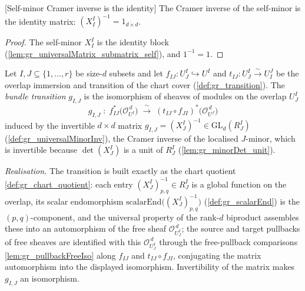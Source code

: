\begin{lemma}

[Self-minor Cramer inverse is the identity]
  \label{lem:gr_universalMinorInv_self}
  The Cramer inverse of the self-minor is the identity matrix:
  \((X^I_I)^{-1} = 1_{d \times d}\).
\end{lemma}
\begin{proof}
  The self-minor \(X^I_I\) is the identity block
  (\cref{lem:gr_universalMatrix_submatrix_self}), and \(1^{-1} = 1\).
\end{proof}

\begin{definition}
  \label{def:gr_bundleTransition}
  Let \(I, J \subseteq \{1,\dots,r\}\) be size-\(d\) subsets and let
  \(f_{IJ} : U^I_J \hookrightarrow U^I\) and \(t_{IJ} : U^I_J \xrightarrow{\sim} U^J_I\) be
  the overlap immersion and transition of the chart cover (\cref{def:gr_transition}). The
  \emph{bundle transition} \(g_{I,J}\) is the isomorphism of sheaves of modules on the
  overlap \(U^I_J\)
  \[
    g_{I,J} \;:\;
      f_{IJ}^{*}\bigl(\mathcal{O}_{U^I}^{\,d}\bigr)
      \;\xrightarrow{\ \sim\ }\;
      (t_{IJ} \circ f_{JI})^{*}\bigl(\mathcal{O}_{U^J}^{\,d}\bigr)
  \]
  induced by the invertible \(d \times d\) matrix
  \(g_{I,J} = (X^I_J)^{-1} \in \mathrm{GL}_d(R^I_J)\) (\cref{def:gr_universalMinorInv}),
  the Cramer inverse of the localised \(J\)-minor, which is invertible because
  \(\det(X^I_J)\) is a unit of \(R^I_J\) (\cref{lem:gr_minorDet_unit}).

  \emph{Realisation.} The transition is built exactly as the chart quotient
  \cref{def:gr_chart_quotient}: each entry \((X^I_J)^{-1}_{p,q} \in R^I_J\) is a global
  function on the overlap, its scalar endomorphism
  \(\mathrm{scalarEnd}\bigl((X^I_J)^{-1}_{p,q}\bigr)\) (\cref{def:gr_scalarEnd}) is the
  \((p,q)\)-component, and the universal property of the rank-\(d\) biproduct assembles
  these into an automorphism of the free sheaf \(\mathcal{O}_{U^I_J}^{\,d}\); the
  source and target pullbacks of free sheaves are identified with this
  \(\mathcal{O}_{U^I_J}^{\,d}\) through the free-pullback comparisons
  \cref{lem:gr_pullbackFreeIso} along \(f_{IJ}\) and \(t_{IJ} \circ f_{JI}\), conjugating
  the matrix automorphism into the displayed isomorphism. Invertibility of the matrix makes
  \(g_{I,J}\) an isomorphism.
\end{definition}


